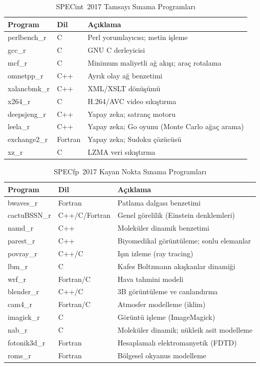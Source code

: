 \begin{table}[H]
\centering
\caption{SPECint~2017 Tamsayı Sınama Programları}
\label{tab:specint2017}
\small
\begin{tabular}{llp{6cm}}
\toprule
\textbf{Program} & \textbf{Dil} & \textbf{Açıklama} \\
\midrule
perlbench\_r   & C       & Perl yorumlayıcısı; metin işleme \\
gcc\_r         & C       & GNU C derleyicisi \\
mcf\_r         & C       & Minimum maliyetli ağ akışı; araç rotalama \\
omnetpp\_r     & C++     & Ayrık olay ağ benzetimi \\
xalancbmk\_r   & C++     & XML/XSLT dönüşümü \\
x264\_r        & C       & H.264/AVC video sıkıştırma \\
deepsjeng\_r   & C++     & Yapay zeka; satranç motoru \\
leela\_r       & C++     & Yapay zeka; Go oyunu (Monte Carlo ağaç arama) \\
exchange2\_r   & Fortran & Yapay zeka; Sudoku çözücüsü \\
xz\_r          & C       & LZMA veri sıkıştırma \\
\bottomrule
\end{tabular}
\end{table}

\begin{table}[H]
\centering
\caption{SPECfp~2017 Kayan Nokta Sınama Programları}
\label{tab:specfp2017}
\small
\begin{tabular}{llp{6cm}}
\toprule
\textbf{Program} & \textbf{Dil} & \textbf{Açıklama} \\
\midrule
bwaves\_r      & Fortran    & Patlama dalgası benzetimi \\
cactuBSSN\_r   & C++/C/Fortran & Genel görelilik (Einstein denklemleri) \\
namd\_r        & C++        & Moleküler dinamik benzetimi \\
parest\_r      & C++        & Biyomedikal görüntüleme; sonlu elemanlar \\
povray\_r      & C++/C      & Işın izleme (ray tracing) \\
lbm\_r         & C          & Kafes Boltzmann akışkanlar dinamiği \\
wrf\_r         & Fortran/C  & Hava tahmini modeli \\
blender\_r     & C++/C      & 3B görüntüleme ve canlandırma \\
cam4\_r        & Fortran/C  & Atmosfer modelleme (iklim) \\
imagick\_r     & C          & Görüntü işleme (ImageMagick) \\
nab\_r         & C          & Moleküler dinamik; nükleik asit modelleme \\
fotonik3d\_r   & Fortran    & Hesaplamalı elektromanyetik (FDTD) \\
roms\_r        & Fortran    & Bölgesel okyanus modelleme \\
\bottomrule
\end{tabular}
\end{table}

